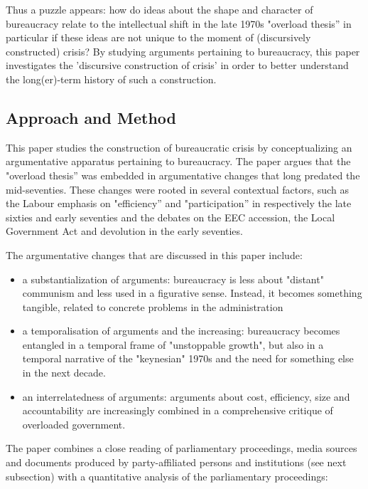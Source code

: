 \documentclass[
]{article}
\begin{document}
Thus a puzzle appears: how do ideas about the shape and character of
bureaucracy relate to the intellectual shift in the late 1970s "overload
thesis'' in particular if these ideas are not unique to the moment of
(discursively constructed) crisis? By studying arguments pertaining to
bureaucracy, this paper investigates the 'discursive construction of
crisis' in order to better understand the long(er)-term history of such
a construction.

\hypertarget{header-n9}{%
\subsection{Approach and Method}\label{header-n9}}

This paper studies the construction of bureaucratic crisis by
conceptualizing an argumentative apparatus pertaining to bureaucracy.
The paper argues that the "overload thesis'' was embedded in
argumentative changes that long predated the mid-seventies. These
changes were rooted in several contextual factors, such as the Labour
emphasis on "efficiency'' and "participation'' in respectively the late
sixties and early seventies and the debates on the EEC accession, the
Local Government Act and devolution in the early seventies.

The argumentative changes that are discussed in this paper include:

\begin{itemize}
\item
  a substantialization of arguments: bureaucracy is less about "distant"
  communism and less used in a figurative sense. Instead, it becomes
  something tangible, related to concrete problems in the administration
\item
  a temporalisation of arguments and the increasing: bureaucracy becomes
  entangled in a temporal frame of "unstoppable growth", but also in a
  temporal narrative of the "keynesian" 1970s and the need for something
  else in the next decade.
\item
  an interrelatedness of arguments: arguments about cost, efficiency,
  size and accountability are increasingly combined in a comprehensive
  critique of overloaded government.
\end{itemize}

The paper combines a close reading of parliamentary proceedings, media
sources and documents produced by party-affiliated persons and
institutions (see next subsection) with a quantitative analysis of the
parliamentary proceedings:
\end{document}
